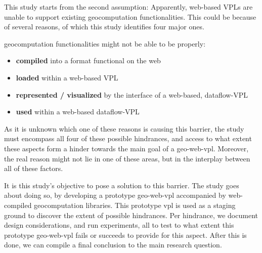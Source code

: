 This study starts from the second assumption: 
Apparently, web-based VPLs are unable to support existing geocomputation functionalities. 
This could be because of several reasons, of which this study identifies four major ones.

geocomputation functionalities might not be able to be properly:
\begin{itemize}[-]
  \item \textbf{compiled} into a format functional on the web
  \item \textbf{loaded} within a web-based VPL
  \item \textbf{represented / visualized} by the interface of a web-based, dataflow-VPL
  \item \textbf{used} within a web-based dataflow-VPL
\end{itemize}
As it is unknown which one of these reasons is causing this barrier, the study must encompass all four of these possible hindrances, and access to what extent these aspects form a hinder towards the main goal of a \ac{geo-web-vpl}. 
Moreover, the real reason might not lie in one of these areas, but in the interplay between all of these factors. 

It is this study's objective to pose a solution to this barrier. 
The study goes about doing so, by developing a prototype \ac{geo-web-vpl} accompanied by web-compiled geocomputation libraries. 
This prototype vpl is used as a staging ground to discover the extent of possible hindrances. 
Per hindrance, we document design considerations, and run experiments, all to test to what extent this prototype \ac{geo-web-vpl} fails or succeeds to provide for this aspect. 
After this is done, we can compile a final conclusion to the main research question. 




